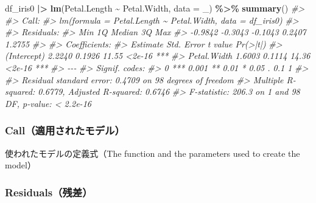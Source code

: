 \documentclass[
  xelatex, ja=standard]{bxjsbook}
\newenvironment{Shaded}{\begin{snugshade}}{\end{snugshade}}
\newcommand{\AttributeTok}[1]{\textcolor[rgb]{0.13,0.29,0.53}{#1}}
\newcommand{\CommentTok}[1]{\textcolor[rgb]{0.56,0.35,0.01}{\textit{#1}}}
\newcommand{\FunctionTok}[1]{\textcolor[rgb]{0.13,0.29,0.53}{\textbf{#1}}}
\newcommand{\NormalTok}[1]{#1}
\newcommand{\SpecialCharTok}[1]{\textcolor[rgb]{0.81,0.36,0.00}{\textbf{#1}}}
\theoremstyle{definition}
\theoremstyle{definition}
\theoremstyle{definition}
\theoremstyle{definition}
\theoremstyle{remark}
\begin{document}
\begin{Shaded}
\begin{Highlighting}[]
\NormalTok{df\_iris0 }\SpecialCharTok{|\textgreater{}} \FunctionTok{lm}\NormalTok{(Petal.Length }\SpecialCharTok{\textasciitilde{}}\NormalTok{ Petal.Width, }\AttributeTok{data =}\NormalTok{ \_) }\SpecialCharTok{\%\textgreater{}\%} \FunctionTok{summary}\NormalTok{()}
\CommentTok{\#\textgreater{} }
\CommentTok{\#\textgreater{} Call:}
\CommentTok{\#\textgreater{} lm(formula = Petal.Length \textasciitilde{} Petal.Width, data = df\_iris0)}
\CommentTok{\#\textgreater{} }
\CommentTok{\#\textgreater{} Residuals:}
\CommentTok{\#\textgreater{}     Min      1Q  Median      3Q     Max }
\CommentTok{\#\textgreater{} {-}0.9842 {-}0.3043 {-}0.1043  0.2407  1.2755 }
\CommentTok{\#\textgreater{} }
\CommentTok{\#\textgreater{} Coefficients:}
\CommentTok{\#\textgreater{}             Estimate Std. Error t value Pr(\textgreater{}|t|)    }
\CommentTok{\#\textgreater{} (Intercept)   2.2240     0.1926   11.55   \textless{}2e{-}16 ***}
\CommentTok{\#\textgreater{} Petal.Width   1.6003     0.1114   14.36   \textless{}2e{-}16 ***}
\CommentTok{\#\textgreater{} {-}{-}{-}}
\CommentTok{\#\textgreater{} Signif. codes:  }
\CommentTok{\#\textgreater{} 0 \textquotesingle{}***\textquotesingle{} 0.001 \textquotesingle{}**\textquotesingle{} 0.01 \textquotesingle{}*\textquotesingle{} 0.05 \textquotesingle{}.\textquotesingle{} 0.1 \textquotesingle{} \textquotesingle{} 1}
\CommentTok{\#\textgreater{} }
\CommentTok{\#\textgreater{} Residual standard error: 0.4709 on 98 degrees of freedom}
\CommentTok{\#\textgreater{} Multiple R{-}squared:  0.6779, Adjusted R{-}squared:  0.6746 }
\CommentTok{\#\textgreater{} F{-}statistic: 206.3 on 1 and 98 DF,  p{-}value: \textless{} 2.2e{-}16}
\end{Highlighting}
\end{Shaded}

\hypertarget{callux9069ux7528ux3055ux308cux305fux30e2ux30c7ux30eb}{%
\subsubsection{Call（適用されたモデル）}\label{callux9069ux7528ux3055ux308cux305fux30e2ux30c7ux30eb}}

使われたモデルの定義式（The function and the parameters used to create the model）

\hypertarget{residualsux6b8bux5dee}{%
\subsubsection{Residuals（残差）}\label{residualsux6b8bux5dee}}
\end{document}
